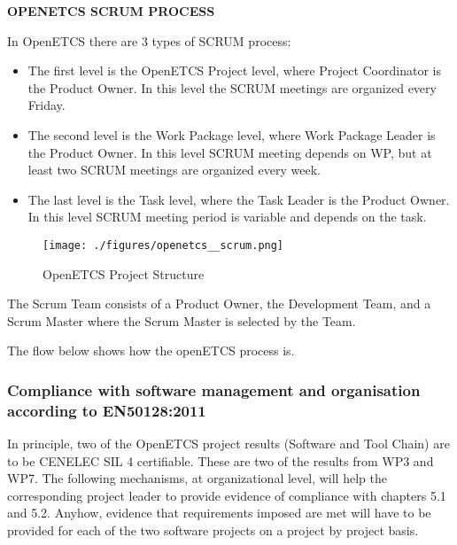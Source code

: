 \documentclass{template/openetcs_article}
\begin{document}
\textbf{OPENETCS SCRUM PROCESS}

In OpenETCS there are 3 types of SCRUM process:
\begin{itemize}
\item The first level is the OpenETCS Project level, where Project Coordinator is the Product Owner. In this level the SCRUM meetings are organized every Friday.
\item The second level is the Work Package level, where Work Package Leader is the Product Owner. In this level SCRUM meeting depends on WP, but at least two SCRUM meetings are organized every week.
\item The last level is the Task level, where the Task Leader is the Product Owner. In this level SCRUM meeting period is variable and depends on the task.
\end{itemize}

\begin{figure}[H]
\centering
\texttt{[image: ./figures/openetcs\_\_scrum.png]}
\caption{OpenETCS Project Structure}
\end{figure}

The Scrum Team consists of a Product Owner, the Development Team, and a Scrum Master where the Scrum Master is selected by the Team.

The flow below shows how the openETCS process is. 

\subsubsection{Compliance with software management and organisation according to EN50128:2011}
In principle, two of the OpenETCS project results (Software and Tool Chain) are to be CENELEC \gls{SIL} 4 certifiable. These are two of the results from WP3 and WP7. The following mechanisms, at organizational level, will help the corresponding project leader to provide evidence of compliance with chapters 5.1 and 5.2. Anyhow, evidence that requirements imposed are met will have to be provided for each of the two software projects on a project by project basis. 
\end{document}
